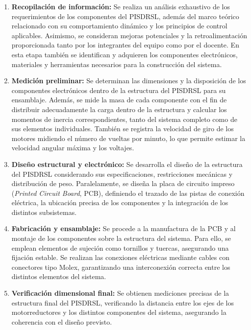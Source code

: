 \documentclass{article}
\begin{document}
\begin{enumerate}
    \item \textbf{Recopilación de información:} Se realiza un análisis exhaustivo de los requerimientos de los componentes del PISDRSL, además del marco teórico relacionado con su comportamiento dinámico y los principios de control aplicables. Asimismo, se consideran mejoras potenciales y la retroalimentación proporcionada tanto por los integrantes del equipo como por el docente. En esta etapa también se identifican y adquieren los componentes electrónicos, materiales y herramientas necesarios para la construcción del sistema.

    \item \textbf{Medición preliminar:} Se determinan las dimensiones y la disposición de los componentes electrónicos dentro de la estructura del PISDRSL para su ensamblaje. Además, se mide la masa de cada componente con el fin de distribuir adecuadamente la carga dentro de la estructura y calcular los momentos de inercia correspondientes, tanto del sistema completo como de sus elementos individuales. También se registra la velocidad de giro de los motores midiendo el número de vueltas por minuto, lo que permite estimar la velocidad angular máxima y los voltajes.

    \item \textbf{Diseño estructural y electrónico:} Se desarrolla el diseño de la estructura del PISDRSL considerando sus especificaciones, restricciones mecánicas y distribución de peso. Paralelamente, se diseña la placa de circuito impreso (\textit{Printed Circuit Board}, PCB), definiendo el trazado de las pistas de conexión eléctrica, la ubicación precisa de los componentes y la integración de los distintos subsistemas.

    \item \textbf{Fabricación y ensamblaje:} Se procede a la manufactura de la PCB y al montaje de los componentes sobre la estructura del sistema. Para ello, se emplean elementos de sujeción como tornillos y tuercas, asegurando una fijación estable. Se realizan las conexiones eléctricas mediante cables con conectores tipo Molex, garantizando una interconexión correcta entre los distintos elementos del sistema.

    \item \textbf{Verificación dimensional final:} Se obtienen mediciones precisas de la estructura final del PISDRSL, verificando la distancia entre los ejes de los motorreductores y los distintos componentes del sistema, asegurando la coherencia con el diseño previsto.


\end{enumerate}
\end{document}
